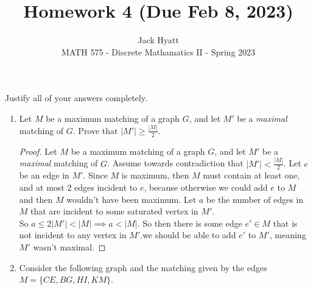 \documentclass[12pt]{article}
\begin{document}
	
	
	
	\title{Homework 4 (Due Feb 8, 2023)}
	\author{Jack Hyatt\\ %
		MATH 575 - Discrete Mathamatics II - Spring 2023} 
	
	\maketitle
	
	Justify all of your answers completely.\\
	
	
	\medskip 
	
\begin{enumerate}

\item Let $M$ be a maximum matching of a graph $G$, and let $M'$ be a {\em maximal} matching of $G$. Prove that $|M'| \geq \frac{|M|}{2}$. 

\begin{proof}
	Let $M$ be a maximum matching of a graph $G$, and let $M'$ be a {\em maximal} matching of $G$. Assume towards contradiction that $|M'| < \frac{|M|}{2}$. Let $e$ be an edge in $M'$. Since $M$ is maximum, then $M$ must contain at least one, and at most 2 edges incident to $e$, because otherwise we could add $e$ to $M$ and then $M$ wouldn't have been maximum. Let $a$ be the number of edges in $M$ that are incident to some saturated vertex in $M'$.\\
	So $a\leq2|M'|<|M| \implies a<|M|$. So then there is some edge $e'\in M$	that is not incident to any vertex in $M'$.\Therefore we should be able to add $e'$ to $M'$, meaning $M'$ wasn't maximal.\contra
\end{proof}

\medskip

\item Consider the following graph and the matching given by the edges $M = \{CE, BG, HI, KM\}$.


\end{enumerate}
\end{document}
